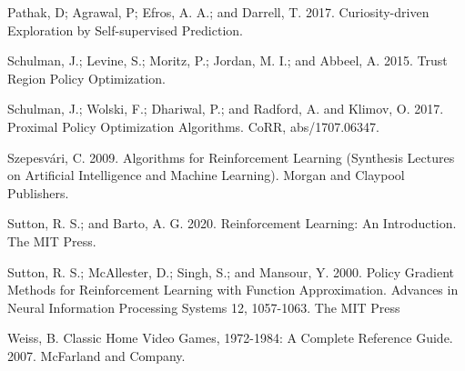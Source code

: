 \documentclass[letterpaper]{article} %
\begin{document}
\smallskip \noindent
Pathak, D; Agrawal, P; Efros, A. A.; and Darrell, T. 2017. Curiosity-driven Exploration by Self-supervised Prediction.

\smallskip \noindent
Schulman, J.; Levine, S.; Moritz, P.; Jordan, M. I.; and Abbeel, A. 2015. Trust Region Policy Optimization. 

\smallskip \noindent
Schulman, J.; Wolski, F.; Dhariwal, P.; and Radford, A. and Klimov, O. 2017. Proximal Policy Optimization Algorithms. CoRR, abs/1707.06347. 

\smallskip \noindent
Szepesvári, C. 2009. Algorithms for Reinforcement Learning (Synthesis Lectures on Artificial Intelligence and Machine Learning). Morgan and Claypool Publishers.

\smallskip \noindent
Sutton, R. S.; and Barto, A. G. 2020. Reinforcement Learning: An Introduction. The MIT Press. 

\smallskip \noindent
Sutton, R. S.; McAllester, D.; Singh, S.; and Mansour, Y. 2000. Policy Gradient Methods for Reinforcement Learning with Function Approximation. Advances in Neural Information Processing Systems 12, 1057-1063. The MIT Press

\smallskip \noindent
Weiss, B. Classic Home Video Games, 1972-1984: A Complete Reference Guide. 2007. McFarland and Company.
\end{document}
